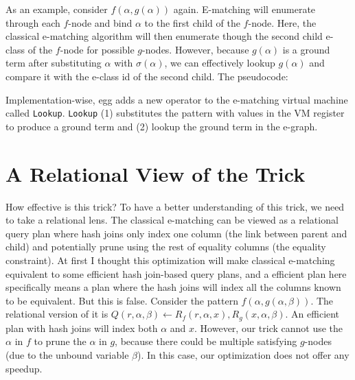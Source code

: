 As an example, consider \(f(\alpha, g(\alpha))\) again.
E-matching will
 enumerate through each \(f\)-node and bind \(\alpha\) to the first child
 of the \(f\)-node.
Here, the classical e-matching algorithm will then
 enumerate though the second child e-class of the \(f\)-node for possible
 \(g\)-nodes.
However, because \(g(\alpha)\) is a ground term after
 substituting \(\alpha\) with \(\sigma(\alpha)\), we can effectively
 lookup \(g(\alpha)\) and compare it with the e-class id of the second
 child.
The pseudocode:
\begin{Shaded}
\begin{Highlighting}[]
    \OperatorTok{!=}

\OperatorTok{=}
    \OperatorTok{!=}
\end{Highlighting}
\end{Shaded}

Implementation-wise, egg adds a new operator to the e-matching virtual
 machine called \texttt{Lookup}.
\texttt{Lookup} (1) substitutes the
 pattern with values in the VM register to produce a ground term and (2)
 lookup the ground term in the e-graph.

\section{A Relational View of the Trick}\label{a-relational-view-of-the-trick}

How effective is this trick? To have a better understanding of this
 trick, we need to take a relational lens.
The classical e-matching can be
 viewed as a relational query plan where hash joins only index one column
 (the link between parent and child) and potentially prune using the rest
 of equality columns (the equality constraint).
At first I thought this
 optimization will make classical e-matching equivalent to some efficient
 hash join-based query plans, 
 and a efficient plan here specifically means a plan
 where the hash joins will index all the columns known to be equivalent.
But this is false.
Consider the pattern \(f(\alpha, g(\alpha,\beta))\).
The relational version of it is
 \(Q(r, \alpha,\beta)\gets R_f(r, \alpha, x),R_g(x,\alpha,\beta)\).
An efficient plan with hash joins will index both \(\alpha\) and \(x\).
However,
 our trick cannot use the \(\alpha\) in \(f\) to prune the
 \(\alpha\) in \(g\), because there could be multiple satisfying
 \(g\)-nodes (due to the unbound variable \(\beta\)).
In this case, our
 optimization does not offer any speedup.

